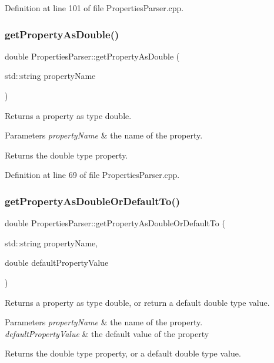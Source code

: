 Definition at line 101 of file Properties\+Parser.\+cpp.

\mbox{\label{class_properties_parser_ac22f3d6ac1e9737a29ec2a69d3302a2f}} 
\subsubsection{get\+Property\+As\+Double()}
{\footnotesize\ttfamily double Properties\+Parser\+::get\+Property\+As\+Double (\begin{DoxyParamCaption}\item[{std\+::string}]{property\+Name }\end{DoxyParamCaption})}

Returns a property as type double. 
\begin{DoxyParams}{Parameters}
{\em property\+Name} & the name of the property. \\
\hline
\end{DoxyParams}
\begin{DoxyReturn}{Returns}
the double type property. 
\end{DoxyReturn}


Definition at line 69 of file Properties\+Parser.\+cpp.

\mbox{\label{class_properties_parser_a269a569985b8fd79b816baa4962cfa62}} 
\subsubsection{get\+Property\+As\+Double\+Or\+Default\+To()}
{\footnotesize\ttfamily double Properties\+Parser\+::get\+Property\+As\+Double\+Or\+Default\+To (\begin{DoxyParamCaption}\item[{std\+::string}]{property\+Name,  }\item[{double}]{default\+Property\+Value }\end{DoxyParamCaption})}

Returns a property as type double, or return a default double type value. 
\begin{DoxyParams}{Parameters}
{\em property\+Name} & the name of the property. \\
\hline
{\em default\+Property\+Value} & the default value of the property \\
\hline
\end{DoxyParams}
\begin{DoxyReturn}{Returns}
the double type property, or a default double type value. 
\end{DoxyReturn}


